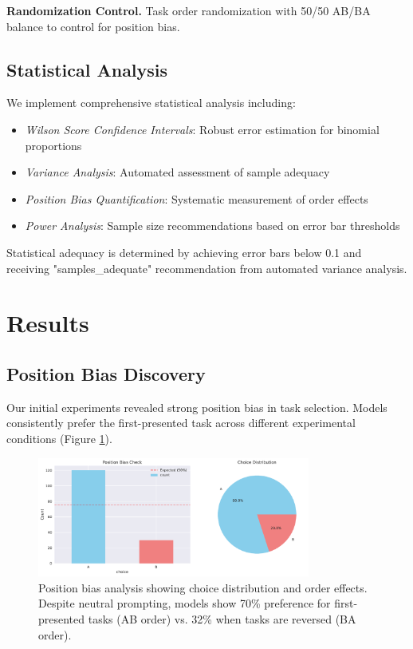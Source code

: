 \documentclass[11pt,a4paper]{article}
\begin{document}
\textbf{Randomization Control.} Task order randomization with 50/50 AB/BA balance to control for position bias.

\subsection{Statistical Analysis}

We implement comprehensive statistical analysis including:
\begin{itemize}
    \item \textit{Wilson Score Confidence Intervals}: Robust error estimation for binomial proportions
    \item \textit{Variance Analysis}: Automated assessment of sample adequacy
    \item \textit{Position Bias Quantification}: Systematic measurement of order effects
    \item \textit{Power Analysis}: Sample size recommendations based on error bar thresholds
\end{itemize}

Statistical adequacy is determined by achieving error bars below 0.1 and receiving "samples\_adequate" recommendation from automated variance analysis.

\section{Results}

\subsection{Position Bias Discovery}

Our initial experiments revealed strong position bias in task selection. Models consistently prefer the first-presented task across different experimental conditions (Figure \ref{fig:position_bias}).

\begin{figure}[h]
    \centering
    \includegraphics[width=0.8\textwidth]{figures/neutral_position_bias.pdf}
    \caption{Position bias analysis showing choice distribution and order effects. Despite neutral prompting, models show 70\% preference for first-presented tasks (AB order) vs. 32\% when tasks are reversed (BA order).}
    \label{fig:position_bias}
\end{figure}
\end{document}
